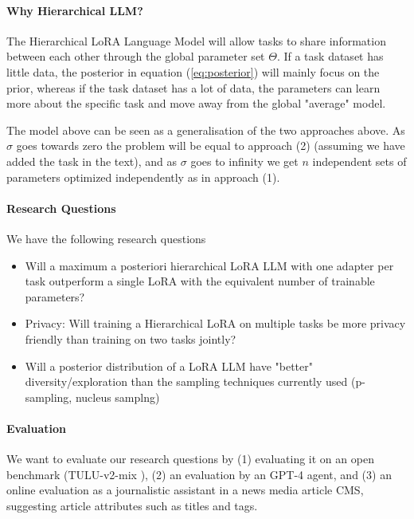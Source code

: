 \documentclass{article}
\begin{document}
\paragraph{Why Hierarchical LLM?}
The Hierarchical LoRA Language Model will allow tasks to share information between each other through the global parameter set $\Theta$.
If a task dataset has little data, the posterior  in equation (\ref{eq:posterior}) will mainly focus on the prior, whereas if the task dataset has a lot of data, the parameters can learn more about the specific task and move away from the global "average" model.

The model above can be seen as a generalisation of the two approaches above.
As $\sigma$ goes towards zero the problem will be equal to approach (2) (assuming we have added the task in the text), 
and as $\sigma$ goes to infinity we get $n$ independent sets of parameters optimized independently as in approach (1).


\paragraph{Research Questions}
We have the following research questions
\begin{itemize}
    \item Will a maximum a posteriori hierarchical LoRA LLM  with one adapter per task outperform a single LoRA with the equivalent number of trainable parameters?
    \item Privacy: Will training a Hierarchical LoRA on multiple tasks be more privacy friendly than training on two tasks jointly?
    \item Will a posterior distribution of a LoRA LLM have "better" diversity/exploration than the sampling techniques currently used (p-sampling, nucleus samplng)
\end{itemize}

\paragraph{Evaluation}
We want to evaluate our research questions by (1) evaluating it on an open benchmark (TULU-v2-mix \cite{ivison_camels_2023}), (2) an evaluation by an GPT-4 agent, and (3) an online evaluation as a journalistic assistant in a news media article CMS, suggesting article attributes such as titles and tags. 





\printbibliography
\end{document}
